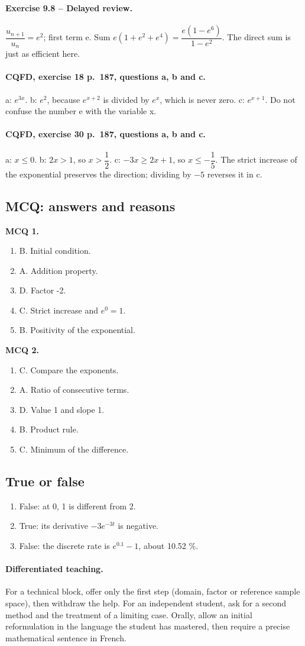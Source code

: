 \paragraph{Exercise 9.8 -- Delayed review.} $\dfrac{u_{n+1}}{u_n}=e^2$; first term e. Sum $e(1+e^2+e^4)=\dfrac{e(1-e^6)}{1-e^2}$. The direct sum is just as efficient here.
\paragraph{CQFD, exercise 18 p.~187, questions a, b and c.} a: $e^{3x}$. b: $e^2$, because $e^{x+2}$ is divided by $e^x$, which is never zero. c: $e^{x+1}$. Do not confuse the number e with the variable x.
\paragraph{CQFD, exercise 30 p.~187, questions a, b and c.} a: $x\leq0$. b: $2x>1$, so $x>\dfrac12$. c: $-3x\geq2x+1$, so $x\leq-\dfrac15$. The strict increase of the exponential preserves the direction; dividing by $-5$ reverses it in c.
\subsection*{MCQ: answers and reasons}
\textbf{MCQ 1.}
\begin{enumerate}
\item B. Initial condition.
\item A. Addition property.
\item D. Factor -2.
\item C. Strict increase and $e^0=1$.
\item B. Positivity of the exponential.
\end{enumerate}
\textbf{MCQ 2.}
\begin{enumerate}
\item C. Compare the exponents.
\item A. Ratio of consecutive terms.
\item D. Value 1 and slope 1.
\item B. Product rule.
\item C. Minimum of the difference.
\end{enumerate}
\subsection*{True or false}
\begin{enumerate}
\item False: at 0, 1 is different from 2.
\item True: its derivative $-3e^{-3t}$ is negative.
\item False: the discrete rate is $e^{0.1}-1$, about 10.52 \%.
\end{enumerate}
\paragraph{Differentiated teaching.} For a technical block, offer only the first step (domain, factor or reference sample space), then withdraw the help. For an independent student, ask for a second method and the treatment of a limiting case. Orally, allow an initial reformulation in the language the student has mastered, then require a precise mathematical sentence in French.
